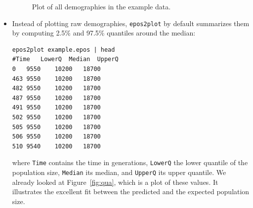 \documentclass[a4paper]{article}
\newcommand{\ty}{\texttt}
\begin{document}
\begin{itemize}
\begin{figure}
\begin{center}
\end{center}
\caption{Plot of all demographies in the example data.}\label{fig:all}
\end{figure}

\item  Instead of plotting raw demographies, \ty{epos2plot} by default
  summarizes them by computing 2.5\% and 97.5\% quantiles around the
  median:
\begin{verbatim}
epos2plot example.epos | head
#Time	LowerQ	Median	UpperQ
0	9550	10200	18700
463	9550	10200	18700
482	9550	10200	18700
487	9550	10200	18700
491	9550	10200	18700
502	9550	10200	18700
505	9550	10200	18700
506	9550	10200	18700
510	9540	10200	18700
\end{verbatim}
where \ty{Time} contains the time in generations, \ty{LowerQ} the
lower quantile of the population size, \ty{Median} its median, and
\ty{UpperQ} its upper quantile. We already looked at
Figure~\ref{fig:qua}, which is a plot of these values. It illustrates
the excellent fit between the predicted and the expected population
size.
\end{itemize}


\end{document}
